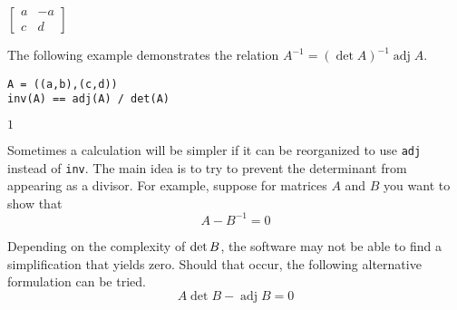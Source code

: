 \documentclass[12pt]{article}
\begin{document}
$\displaystyle
\begin{bmatrix}
a & -a
\\[1ex]
c & d
\end{bmatrix}
$

\bigskip

The following example demonstrates the relation
$A^{-1}=(\operatorname{det}A)^{-1}\operatorname{adj}A$.

{\color{blue}
\begin{verbatim}
A = ((a,b),(c,d))
inv(A) == adj(A) / det(A)
\end{verbatim}
}

$\displaystyle 1$

\bigskip

Sometimes a calculation will be simpler if it can be reorganized to use
\verb$adj$ instead of \verb$inv$.
The main idea is to try to prevent the determinant from appearing as a
divisor.
For example, suppose for matrices $A$ and $B$ you want to show that
\begin{equation*}
{A}-{B}^{-1}=0
\end{equation*}

Depending on the complexity of $\mathop{\rm det}B$, the software
may not be able to find a simplification that yields zero.
Should that occur, the following alternative formulation can be tried.
\begin{equation*}
A\operatorname{det}B-\operatorname{adj}B=0
\end{equation*}
\end{document}
